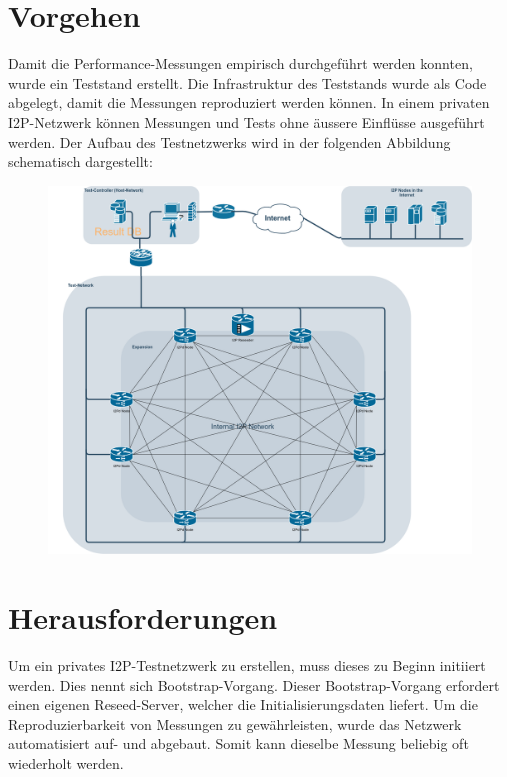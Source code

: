 \documentclass[
	a4paper,10pt
]{scrartcl}
\begin{document}
\section{Vorgehen}

Damit die Performance-Messungen empirisch durchgeführt werden konnten, wurde ein Teststand erstellt.
Die Infrastruktur des Teststands wurde als Code abgelegt, damit die Messungen reproduziert werden können.
In einem privaten I2P-Netzwerk können Messungen und Tests ohne äussere Einflüsse ausgeführt werden.
Der Aufbau des Testnetzwerks wird in der folgenden Abbildung schematisch dargestellt:


\begin{figure}[H]
  \includegraphics[width=1.0\textwidth]{i2p-testnetwork.png}
\end{figure}


\section{Herausforderungen}

Um ein privates I2P-Testnetzwerk zu erstellen, muss dieses zu Beginn initiiert werden. Dies nennt sich Bootstrap-Vorgang. Dieser Bootstrap-Vorgang erfordert einen eigenen Reseed-Server, welcher die Initialisierungsdaten liefert.
Um die Reproduzierbarkeit von Messungen zu gewährleisten, wurde das Netzwerk automatisiert auf- und abgebaut.
Somit kann dieselbe Messung beliebig oft wiederholt werden.
\end{document}
